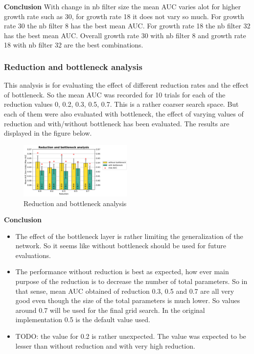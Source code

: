 \textbf{Conclusion}
With change in nb filter size the mean AUC varies alot for higher growth rate such as 30, for growth rate 18 it does not vary so much. For growth rate 30 the nb filter 8 has the best mean AUC. 
For growth rate 18 the nb filter 32 has the best mean AUC. Overall growth rate 30 with nb filter 8 and growth rate 18 with nb filter 32 are the best combinations.
\subsubsection{Reduction and bottleneck analysis}
This analysis is for evaluating the effect of different reduction rates and the effect of bottleneck. So the mean AUC was recorded for 10 trials for each of the reduction values 0, 0.2, 0.3, 0.5, 0.7. This is a rather coarser 
search space. But each of them were also evaluated with bottleneck, the effect of varying values of reduction and with/without bottleneck has been evaluated. The results are displayed in the figure below. 
\begin{figure}[ht]
\centering
\includegraphics[width=0.5\textwidth]{images/densenet/simple/densenet_simple_reduction_bottleneck}
\caption{\label{fig:densenet_simple_reduction_bottleneck}Reduction and bottleneck analysis}
\end{figure}

\textbf{Conclusion}
\begin{itemize}
 \item The effect of the bottleneck layer is rather limiting the generalization of the network. So it seems like without bottleneck should be used for future evaluations.
 \item The performance without reduction is best as expected, how ever main purpose of the reduction is to decrease the number of total parameters. So in that sense, mean AUC obtained of reduction 0.3, 0.5 and 0.7 are all very 
 good even though the size of the total parameters is much lower. So values around 0.7 will be used for the final grid search. In the original implementation 0.5 is the default value used.
 \item TODO: the value for 0.2 is rather unexpected. The value was expected to be lesser than without reduction and with very high reduction.
\end{itemize}

